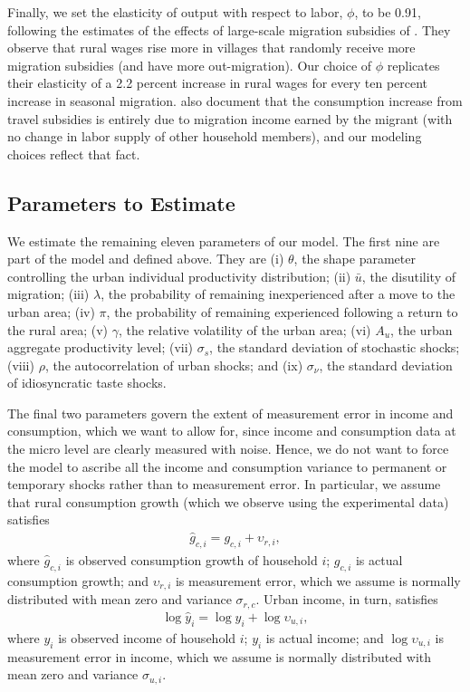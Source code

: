 \documentclass[12pt,pdftex]{article}
\begin{document}
Finally, we set the elasticity of output with respect to labor, $\phi$, to be 0.91, following the estimates of the effects of large-scale migration subsidies of \citet{akch17}. They observe that rural wages rise more in villages that randomly receive more migration subsidies (and have more out-migration). Our choice of $\phi$ replicates their elasticity of a 2.2 percent increase in rural wages for every ten percent increase in seasonal migration. \citet{akch17} also document that the consumption increase from travel subsidies is entirely due to migration income earned by the migrant (with no change in labor supply of other household members), and our modeling choices reflect that fact.

\subsection{Parameters to Estimate}

We estimate the remaining eleven parameters of our model. The first nine are part of the model and defined above. They are (i) $\theta$, the shape parameter controlling the urban individual productivity distribution; (ii) $\bar{u}$, the disutility of migration; (iii) $\lambda$, the probability of remaining inexperienced after a move to the urban area; (iv) $\pi$, the probability of remaining experienced following a return to the rural area; (v) $\gamma$, the relative volatility of the urban area; (vi) $A_u$, the urban aggregate productivity level; (vii) $\sigma_s$, the standard deviation of stochastic shocks; (viii) $\rho$, the autocorrelation of urban shocks; and (ix) $\sigma_{\nu}$, the standard deviation of idiosyncratic taste shocks.

The final two parameters govern the extent of measurement error in income and consumption, which we want to allow for, since income and consumption data at the micro level are clearly measured with noise. Hence, we do not want to force the model to ascribe all the income and consumption variance to permanent or temporary shocks rather than to measurement error. In particular, we assume that rural consumption growth (which we observe using the experimental data) satisfies
\begin{align}
\hat g_{c,i} = g_{c,i} + \upsilon_{r,i},
\end{align}
where $\hat g_{c,i} $ is observed consumption growth of household $i$; $g_{c,i}$ is actual consumption growth; and $\upsilon_{r,i}$ is measurement error, which we assume is normally distributed with mean zero and variance $\sigma_{r,c}.$ Urban income, in turn, satisfies
\begin{align}
\log \hat y_i = \log  y_i + \log \upsilon_{u,i},
\end{align}
where  $y_i$ is observed income of household $i$; $y_i$ is actual income; and $\log \upsilon_{u,i}$ is measurement error in income, which we assume is normally distributed with mean zero and variance $\sigma_{u,i}.$
\end{document}
